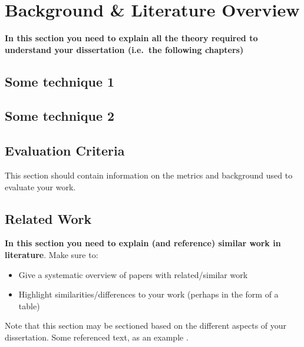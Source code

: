 \chapter{Background \& Literature Overview}
\textbf{In this section you need to explain all the theory required to understand your dissertation (i.e.\ the following chapters)}
\section{Some technique 1}
\blindtext
\section{Some technique 2}
\blindtext
\section{Evaluation Criteria}
This section should contain information on the metrics and background used to evaluate your work.
\section{Related Work}
\textbf{In this section you need to explain (and reference) similar work in literature}.  Make sure to:

\begin{itemize}
 \item Give a systematic overview of papers with related/similar work
 \item Highlight similarities/differences to your work (perhaps in the form of a table)
\end{itemize}

Note that this section may be sectioned based on the different aspects of your dissertation.  Some referenced text, as an example \citep{Arrighi2003, WithersMartinez2012, Ebejer2016}.

